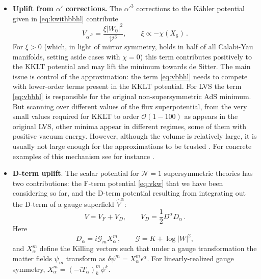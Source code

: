 \documentclass[12pt,a4wide]{article}
\def\G{\mathcal{G}}
\def\O{\mathcal{O}}
\def\V{\mathcal{V}}
\def\be{\begin{equation}}
\def\ee{\end{equation}}
\begin{document}
\begin{itemize}
\item{\bf Uplift from $\alpha'$ corrections.} The 
$\alpha'^3$ corrections to the K\"ahler potential given in \eqref{eq:kwithbbhl} contribute
\be \label{eq:vbbhl}
V_{\alpha'^3}= \frac{\xi \left|W_0\right|^2}{\V^3}, \qquad \xi \propto -\chi(X_6)\,.
\ee
For $\xi>0$ (which, in light of mirror symmetry, holds in half of all Calabi-Yau manifolds, setting aside cases with $\chi=0$) this term contributes positively to the KKLT potential and may lift the minimum towards de Sitter. The main issue is control of the approximation: the term \eqref{eq:vbbhl} needs to compete with lower-order terms present in the KKLT potential. For LVS the term  \eqref{eq:vbbhl} is responsible for the original non-supersymmetric AdS minimum. But scanning over different values of the flux superpotential, from the very small values required for KKLT to order $\O(1-100)$ as appears in the original LVS, other minima appear in different regimes, some of them with positive vacuum energy.  However, although the volume is relatively large, it is usually not large enough for the approximations to be trusted \cite{AbdusSalam:2007pm}. For concrete examples of this mechanism see for instance \cite{Balasubramanian:2004uy,Westphal:2006tn,Rummel:2011cd,Louis:2012nb}.

\item {\bf D-term uplift}. The scalar potential for $\mathcal{N}=1$ supersymmetric theories has two contributions: the F-term potential \eqref{eq:vkw} that we have been considering so far, and the D-term potential resulting from integrating out the D-term of a gauge superfield $\hat V^\alpha$:
\be
V=V_F+V_D, \qquad V_D=\frac{1}{2}D^\alpha D_\alpha\,.
\ee
Here
\be\label{dterm}
D_\alpha=i\G_m X^m_\alpha,\qquad \G=K+\log|W|^2,
\ee
and $X^m_\alpha$ define the Killing vectors such that under  
a gauge transformation the matter fields $\psi_m$ transform as $\delta \psi^m = X^m_\alpha \epsilon^\alpha$.
For linearly-realized gauge symmetry, $X^m_\alpha=\left( -i T_\alpha\right)^m_k\psi^k$.


\end{itemize}
\end{document}
